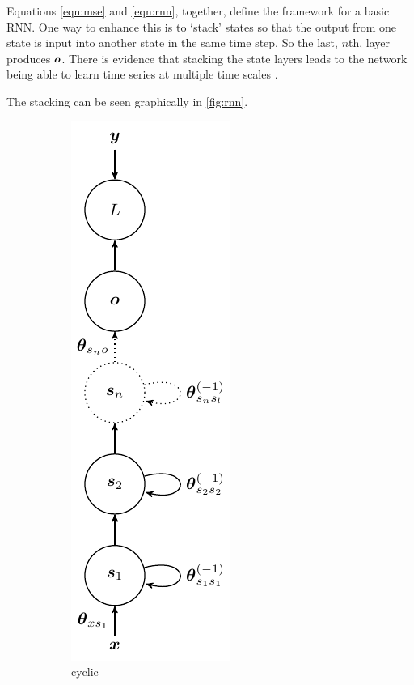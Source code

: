 Equations \ref{eqn:mse} and \ref{eqn:rnn}, together, define the framework for a basic RNN. One way to enhance this is to `stack' states so that the output from one state is input into another state in the same time step. So the last, $n$th, layer produces $\boldsymbol{o}$.  There is evidence that stacking the state layers leads to the network being able to learn time series at multiple time scales \cite{Hermans2013} \cite{Pascanu2013a}.

The stacking can be seen graphically in \ref{fig:rnn}.

\begin{figure}[H]
  \centering
  \begin{subfigure}[]{.2\textwidth}
    \begin{center}
    \includegraphics[]{figs/rnn.pdf}
    \end{center}
    \caption{cyclic}
    \label{fig:rnn_f}
  \end{subfigure}
  \begin{subfigure}[]{.79\textwidth}

\end{subfigure}
\end{figure}
